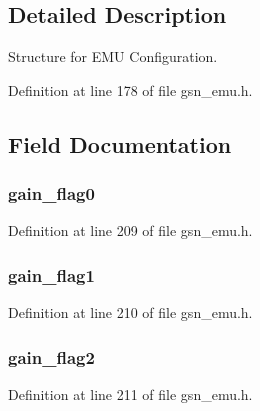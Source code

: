 \subsection{Detailed Description}
Structure for EMU Configuration. 

Definition at line 178 of file gsn\_\-emu.h.



\subsection{Field Documentation}
\hypertarget{a00058_a3d49099fd795c8db6095955c47fd8bad}{
\subsubsection[{gain\_\-flag0}]{ {\bf gain\_\-flag0}}}
\label{a00058_a3d49099fd795c8db6095955c47fd8bad}


Definition at line 209 of file gsn\_\-emu.h.

\hypertarget{a00058_a698528138124647d5a7382f5de1f51aa}{
\subsubsection[{gain\_\-flag1}]{ {\bf gain\_\-flag1}}}
\label{a00058_a698528138124647d5a7382f5de1f51aa}


Definition at line 210 of file gsn\_\-emu.h.

\hypertarget{a00058_a68a3dfdb7b84fcbf4d3b6159019930f1}{
\subsubsection[{gain\_\-flag2}]{ {\bf gain\_\-flag2}}}
\label{a00058_a68a3dfdb7b84fcbf4d3b6159019930f1}


Definition at line 211 of file gsn\_\-emu.h.

